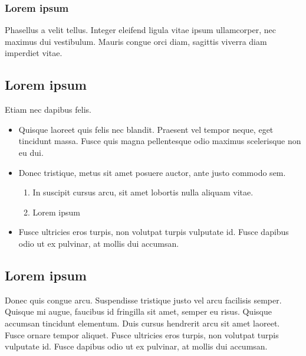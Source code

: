 \subsubsection{Lorem ipsum}

Phasellus a velit tellus. Integer eleifend ligula vitae ipsum ullamcorper, nec maximus dui vestibulum. Mauris congue orci diam, sagittis viverra diam imperdiet vitae.

\subsection{Lorem ipsum}

Etiam nec dapibus felis.

\begin{itemize}
\item Quisque laoreet quis felis nec blandit. Praesent vel tempor neque, eget tincidunt massa. Fusce quis magna pellentesque odio maximus scelerisque non eu dui.
\item Donec tristique, metus sit amet posuere auctor, ante justo commodo sem.
\begin{enumerate}
\item In suscipit cursus arcu, sit amet lobortis nulla aliquam vitae.
\item Lorem ipsum
\end{enumerate}
\item Fusce ultricies eros turpis, non volutpat turpis vulputate id. Fusce dapibus odio ut ex pulvinar, at mollis dui accumsan.
\end{itemize}

\subsection{Lorem ipsum}

Donec quis congue arcu. Suspendisse tristique justo vel arcu facilisis semper. Quisque mi augue, faucibus id fringilla sit amet, semper eu risus. Quisque accumsan tincidunt elementum. Duis cursus hendrerit arcu sit amet laoreet. Fusce ornare tempor aliquet. Fusce ultricies eros turpis, non volutpat turpis vulputate id. Fusce dapibus odio ut ex pulvinar, at mollis dui accumsan. 

